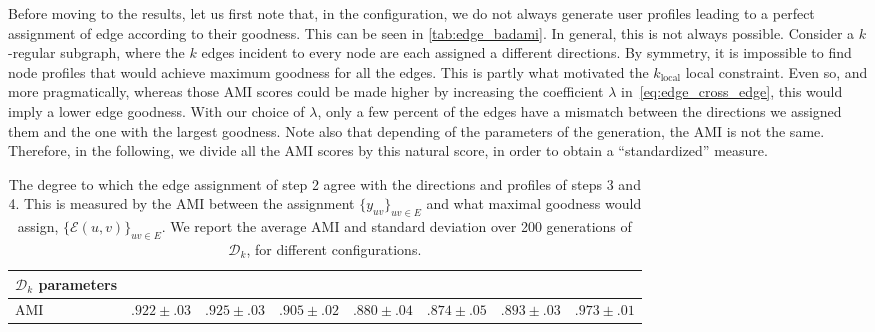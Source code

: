 Before moving to the results, let us first note that,
in the  configuration, we do not always
generate user profiles leading to a perfect assignment of edge according to their goodness. This can
be seen in \autoref{tab:edge_badami}. In
general, this is not always possible. Consider a $k$-regular subgraph, where the $k$ edges incident
to every node are each assigned a different directions. By symmetry, it is impossible to find node
profiles that would achieve maximum goodness for all the edges. This is partly what motivated the
$k_{\mathrm{local}}$ local constraint. Even so, and more pragmatically, whereas those AMI scores
could be made higher by increasing the coefficient $\lambda$ in~\eqref{eq:edge_cross_edge}, this would
imply a lower edge goodness. With our choice of $\lambda$, only a few percent of the edges have a mismatch
between the directions we assigned them and the one with the largest goodness. Note also that
depending of the parameters of the generation, the AMI is not the same. Therefore, in the following,
we divide all the AMI scores by this natural score, in order to obtain a \enquote{standardized} measure.

\begin{table}[htb]
\begin{adjustwidth}{-1.5cm}{}
  \centering
  \small
  \caption{The degree to which the edge assignment of step 2 agree with the directions and profiles
    of steps 3 and 4. This is measured by the AMI between the assignment $\{y_{uv}\}_{uv \in E}$ and
    what maximal goodness would assign, \ie{} $\{\mathcal{E}(u,v)\}_{uv \in E}$. We report the
    average AMI and standard deviation over 200 generations of $\mathcal{D}_k$, for different
    configurations.  \label{tab:edge_badami}}
\begin{tabular}{lccccccc}
  \toprule
  {$\mathcal{D}_k$ parameters}  & {{}}   & {\smallk{}}    & {\largek{}}    & {\smallo{}}    & {\largeo{}}    & {\fdirs{}}     & {\larged{}}    \\
  \midrule
  AMI & $.922 \pm .03$ & $.925 \pm .03$ & $.905 \pm .02$ & $.880 \pm .04$ & $.874 \pm .05$ & $.893 \pm .03$ & $.973 \pm .01$ \\
  \bottomrule
\end{tabular}
\end{adjustwidth}
\end{table}

